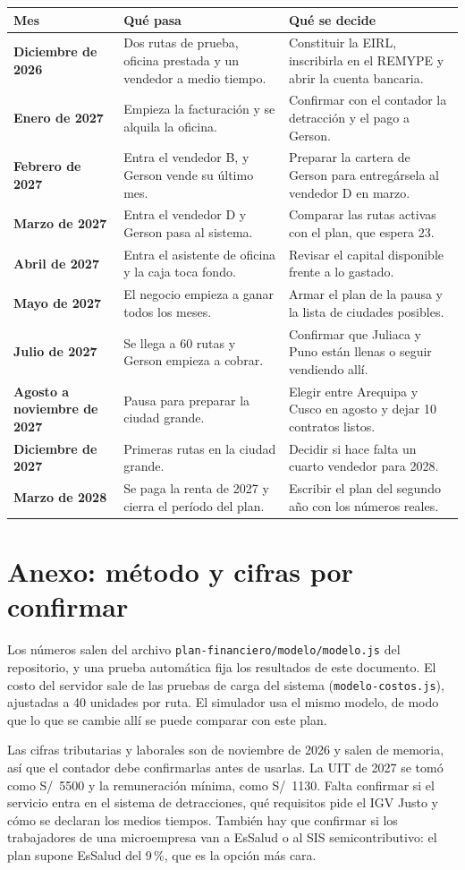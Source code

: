 \documentclass[10.5pt,a4paper]{article}
\begin{document}
{\small
\begin{tabularx}{\linewidth}{@{}>{\bfseries}p{3.2cm}XX@{}}
\toprule
\normalfont Mes & Qué pasa & Qué se decide\\
\midrule
Diciembre de 2026 & Dos rutas de prueba, oficina prestada y un vendedor a medio tiempo. & Constituir la EIRL, inscribirla en el REMYPE y abrir la cuenta bancaria.\\
Enero de 2027 & Empieza la facturación y se alquila la oficina. & Confirmar con el contador la detracción y el pago a Gerson.\\
Febrero de 2027 & Entra el vendedor B, y Gerson vende su último mes. & Preparar la cartera de Gerson para entregársela al vendedor D en marzo.\\
Marzo de 2027 & Entra el vendedor D y Gerson pasa al sistema. & Comparar las rutas activas con el plan, que espera 23.\\
Abril de 2027 & Entra el asistente de oficina y la caja toca fondo. & Revisar el capital disponible frente a lo gastado.\\
Mayo de 2027 & El negocio empieza a ganar todos los meses. & Armar el plan de la pausa y la lista de ciudades posibles.\\
Julio de 2027 & Se llega a 60 rutas y Gerson empieza a cobrar. & Confirmar que Juliaca y Puno están llenas o seguir vendiendo allí.\\
Agosto a noviembre de 2027 & Pausa para preparar la ciudad grande. & Elegir entre Arequipa y Cusco en agosto y dejar 10 contratos listos.\\
Diciembre de 2027 & Primeras rutas en la ciudad grande. & Decidir si hace falta un cuarto vendedor para 2028.\\
Marzo de 2028 & Se paga la renta de 2027 y cierra el período del plan. & Escribir el plan del segundo año con los números reales.\\
\bottomrule
\end{tabularx}}

\section*{Anexo: método y cifras por confirmar}

Los números salen del archivo \texttt{plan-financiero/modelo/modelo.js} del repositorio, y una prueba automática fija los resultados de este documento. El costo del servidor sale de las pruebas de carga del sistema (\texttt{modelo-costos.js}), ajustadas a 40 unidades por ruta. El simulador usa el mismo modelo, de modo que lo que se cambie allí se puede comparar con este plan.

Las cifras tributarias y laborales son de noviembre de 2026 y salen de memoria, así que el contador debe confirmarlas antes de usarlas. La UIT de 2027 se tomó como S/~5500 y la remuneración mínima, como S/~1130. Falta confirmar si el servicio entra en el sistema de detracciones, qué requisitos pide el IGV Justo y cómo se declaran los medios tiempos. También hay que confirmar si los trabajadores de una microempresa van a EsSalud o al SIS semicontributivo: el plan supone EsSalud del 9\,\%, que es la opción más cara.
\end{document}

